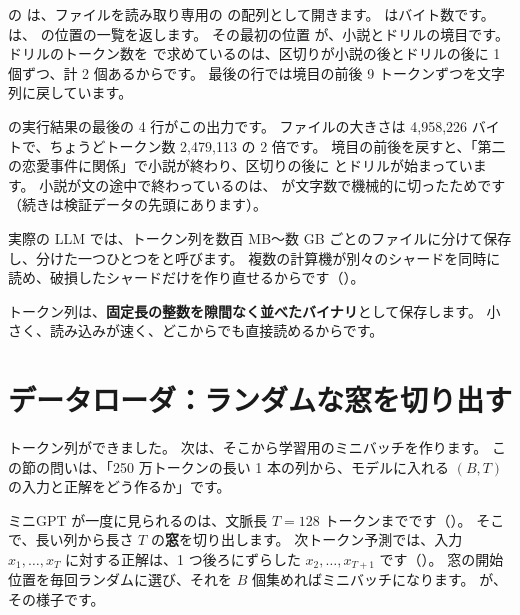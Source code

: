 の  は、ファイルを読み取り専用の  の配列として開きます。
 はバイト数です。
 は、 の位置の一覧を返します。
その最初の位置  が、小説とドリルの境目です。
ドリルのトークン数を  で求めているのは、区切りが小説の後とドリルの後に 1 個ずつ、計 2 個あるからです。
最後の行では境目の前後 9 トークンずつを文字列に戻しています。

\providecommand{\ptneedspace}[1]{\par\penalty0\relax\ifdim\pagetotal<\pagegoal\ifdim\dimexpr\pagegoal-\pagetotal\relax<#1\relax\newpage\fi\fi}
\ptneedspace{12\baselineskip}

の実行結果の最後の 4 行がこの出力です。
ファイルの大きさは 4,958,226 バイトで、ちょうどトークン数 2,479,113 の 2 倍です。
境目の前後を戻すと、「第二の恋愛事件に関係」で小説が終わり、区切りの後に  とドリルが始まっています。
小説が文の途中で終わっているのは、 が文字数で機械的に切ったためです（続きは検証データの先頭にあります）。

実際の LLM では、トークン列を数百 MB〜数 GB ごとのファイルに分けて保存し、分けた一つひとつをと呼びます。
複数の計算機が別々のシャードを同時に読め、破損したシャードだけを作り直せるからです（）。

トークン列は、\textbf{固定長の整数を隙間なく並べたバイナリ}として保存します。
小さく、読み込みが速く、どこからでも直接読めるからです。

\section{データローダ：ランダムな窓を切り出す}\label{sec:pt-loader}

トークン列ができました。
次は、そこから学習用のミニバッチを作ります。
この節の問いは、「250 万トークンの長い 1 本の列から、モデルに入れる $(B, T)$ の入力と正解をどう作るか」です。

ミニGPT が一度に見られるのは、文脈長 $T=128$ トークンまでです（）。
そこで、長い列から長さ $T$ の\textbf{窓}を切り出します。
次トークン予測では、入力 $x_1,\dots,x_T$ に対する正解は、1 つ後ろにずらした $x_2,\dots,x_{T+1}$ です（）。
窓の開始位置を毎回ランダムに選び、それを $B$ 個集めればミニバッチになります。
が、その様子です。

